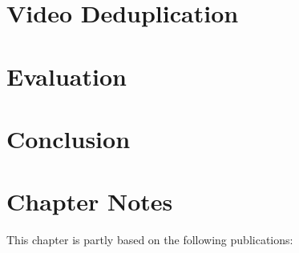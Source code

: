 \section{Video Deduplication}

\section{Evaluation}

\section{Conclusion}

\section*{Chapter Notes}
This chapter is partly based on the following publications:
